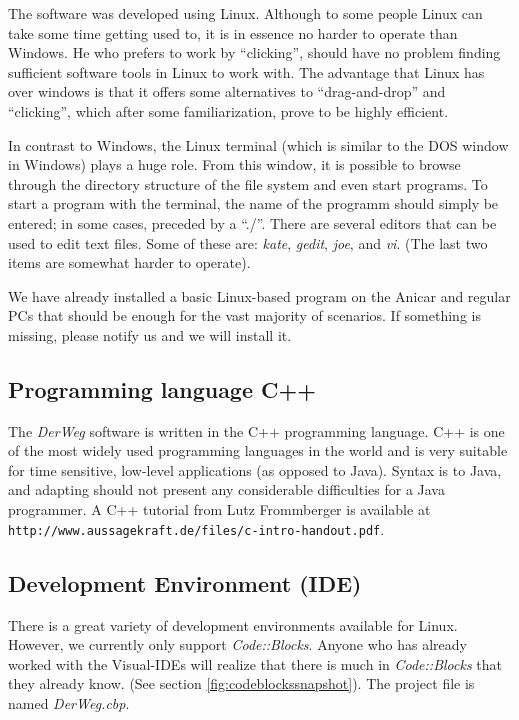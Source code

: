 \documentclass[a4paper, 11pt]{article}
\newcommand{\DerWeg}{\textit{DerWeg }} %
\begin{document}
The software was developed using Linux. Although to some people Linux can take some time getting used to, it is in essence no harder to operate than Windows. He who prefers to work by "`clicking"', should have no problem finding sufficient software tools in Linux to work with. The advantage that Linux has over windows is that it offers some alternatives to "`drag-and-drop"' and "`clicking"', which after some familiarization, prove to be highly efficient. 

In contrast to Windows, the Linux terminal (which is similar to the DOS window in Windows) plays a huge role. From this window, it is possible to browse through the directory structure of the file system and even start programs. To start a program with the terminal, the name of the programm should simply be entered; in some cases, preceded by a "`./"'. There are several editors that can be used to edit text files. Some of these are: \textit{kate}, \textit{gedit}, \textit{joe}, and \textit{vi}. (The last two items are somewhat harder to operate).

We have already installed a basic Linux-based program  on the Anicar and regular PCs that should be enough for the vast majority of scenarios. If something is missing, please notify us and we will install it.

\subsection{Programming language C++}

The \DerWeg software is written in the C++ programming language. C++ is one of the most widely used programming languages in the world and is very suitable for time sensitive, low-level applications (as opposed to Java). Syntax is to Java, and adapting should not present any considerable difficulties for a Java programmer. A C++ tutorial from Lutz Frommberger is available at \texttt{http://www.aussagekraft.de/files/c-intro-handout.pdf}.

\subsection{Development Environment (IDE)}

There is a great variety of development environments available for Linux. However, we currently only support \textit{Code::Blocks}. Anyone who has already worked with the Visual-IDEs will realize that there is much in \textit{Code::Blocks} that they already know. (See section \ref{fig:codeblockssnapshot}). The project file is named \textit{DerWeg.cbp}.
\end{document}
